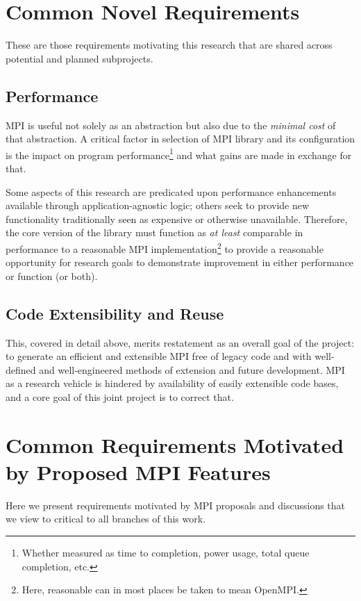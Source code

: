 \documentclass{article}
\begin{document}
\section{Common Novel Requirements}

These are those requirements motivating this research that are shared across potential and planned subprojects.

\subsection{Performance}

MPI is useful not solely as an abstraction but also due to the \emph{minimal cost} of that abstraction.  A critical factor in selection of MPI library and its configuration is the impact on program performance\footnote{Whether measured as time to completion, power usage, total queue completion, etc.} and what gains are made in exchange for that.  

Some aspects of this research are predicated upon performance enhancements available through application-agnostic logic; others seek to provide new functionality traditionally seen as expensive or otherwise unavailable.  Therefore, the core version of the library must function as \emph{at least} comparable in performance to a reasonable MPI implementation\footnote{Here, reasonable can in most places be taken to mean OpenMPI.} to provide a reasonable opportunity for research goals to demonstrate improvement in either performance or function (or both).

\subsection{Code Extensibility and Reuse}

This, covered in detail above, merits restatement as an overall goal of the project:  to generate an efficient and extensible MPI free of legacy code and with well-defined and well-engineered methods of extension and future development.  MPI as a research vehicle is hindered by availability of easily extensible code bases, and a core goal of this joint project is to correct that.

\section{Common Requirements Motivated by Proposed MPI Features}

Here we present requirements motivated by MPI proposals and discussions that we view to critical to all branches of this work.
\end{document}

